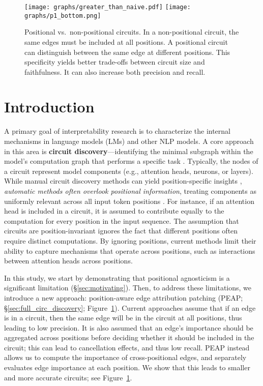 \begin{figure}[ht]
    \centering
    \texttt{[image: graphs/greater\_than\_naive.pdf]}
    \vspace{0.5cm}
    \texttt{[image: graphs/p1\_bottom.png]}
    \vspace{-5pt}
    \caption{\textcolor{positional}{Positional} vs.\ \textcolor{nonpositional}{non-positional} circuits. In a \textcolor{nonpositional}{non-positional} circuit, the same edges must be included at all positions. A \textcolor{positional}{positional} circuit can distinguish between the same edge at different positions. This specificity yields better trade-offs between circuit size and faithfulness. It can also increase both precision and recall.}
    \label{fig:p1}
    \vspace{-5pt}
\end{figure}

\section{Introduction}

A primary goal of interpretability research is to characterize the internal mechanisms in language models (LMs) and other NLP models. 
A core approach in this area is \textbf{circuit discovery}---identifying the minimal subgraph within the model's computation graph that performs a specific task \citep{olah2021framework,olah-mech}.
Typically, the nodes of a circuit represent model components (e.g., attention heads, neurons, or layers).
While manual circuit discovery methods can yield position-specific insights \citep{wanginterpretability,goldowskydill2023localizingmodelbehaviorpath}, \emph{automatic methods often overlook positional information}, treating components as uniformly relevant across all input token positions \citep{conmytowards,syed2023attribution}. 
For instance, if an attention head is included in a circuit, it is assumed to contribute equally to the computation for every position in the input sequence.
The assumption that circuits are position-invariant ignores the fact that different positions often require distinct computations.
By ignoring positions, current methods limit their ability to capture mechanisms that operate across positions, such as interactions between attention heads across positions.

In this study, we start by demonstrating that positional agnosticism is a significant limitation (\S\ref{sec:motivating}). Then, to address these limitations, we introduce a new approach: position-aware edge attribution patching (PEAP; \S\ref{sec:full_circ_discovery}; Figure~\ref{fig:p1}). Current approaches  assume that if an edge is in a circuit, then the same edge will be in the circuit at all positions, thus leading to low precision. It is also assumed that an edge's importance should be aggregated across positions before deciding whether it should be included in the circuit; this can lead to cancellation effects, and thus low recall. PEAP instead allows us to compute the importance of cross-positional edges, and separately evaluates edge importance at each position. We show that this leads to smaller and more accurate circuits; see Figure~\ref{fig:p1}.

